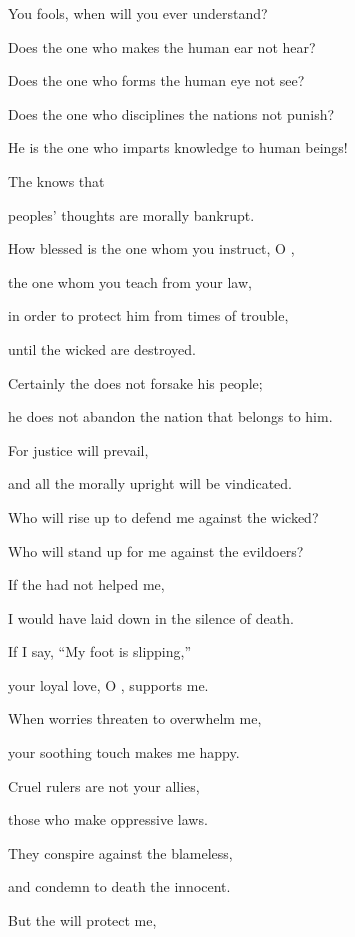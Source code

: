 {\par }{\Q You fools,
when
will you ever
understand?
\par }{\Q {}Does
the one who makes
the human ear
not
hear?
\par }{\Q Does
the one who forms
the human eye
not
see?
\par }{\Q {}Does
the one who disciplines
the nations
not
punish?
\par }{\Q He is the one who
imparts
knowledge
to human beings!
\par }{\Q {}The
{}
knows
that
\par }{\Q peoples’
thoughts
are morally bankrupt.
\par }{\Q {}How blessed
is the one
whom
you instruct,
O
{},
\par }{\Q the one whom
you teach
from your law,
\par }{\Q {}in order to protect
him from times
of trouble,
\par }{\Q until
the wicked
are destroyed.
\par }{\Q {}Certainly
the {}
does not
forsake
his people;
\par }{\Q he does not
abandon
the nation that belongs to him.
\par }{\Q {}For
justice
will prevail,
\par }{\Q and all
the morally
upright
will be vindicated.
\par }{\Q {}Who
will rise
up to defend me against
the wicked?
\par }{\Q Who
will stand
up for me against
the evildoers?
\par }{\Q {}If
the {}
had not helped
me,
\par }{\Q I would have laid down in the silence
of death.
\par }{\Q {}If
I say,
“My foot
is slipping,”
\par }{\Q your loyal love,
O
{}, supports me.
\par }{\Q {}When worries
threaten
to overwhelm
me,

\par }{\Q your soothing touch
makes
me
happy.
\par }{\Q {}Cruel
rulers are not your allies,
\par }{\Q those who make
oppressive
laws.
\par }{\Q {}They conspire
against
the blameless,
\par }{\Q and condemn
to death
the innocent.
\par }{\Q {}But the
{}
will protect
me,

}
